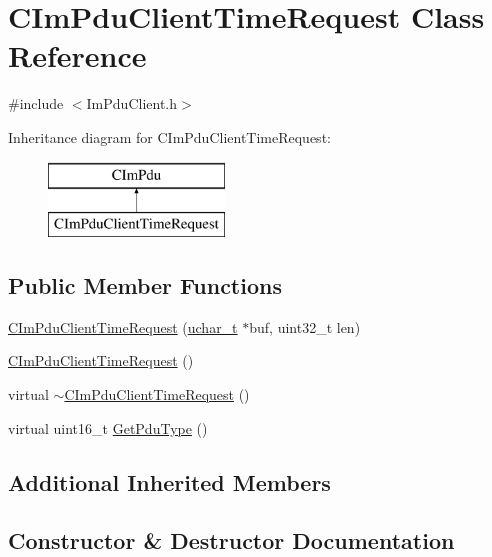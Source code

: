 \hypertarget{class_c_im_pdu_client_time_request}{}\section{C\+Im\+Pdu\+Client\+Time\+Request Class Reference}
\label{class_c_im_pdu_client_time_request}


{\ttfamily \#include $<$Im\+Pdu\+Client.\+h$>$}

Inheritance diagram for C\+Im\+Pdu\+Client\+Time\+Request\+:\begin{figure}[H]
\begin{center}
\leavevmode
\includegraphics[height=2.000000cm]{class_c_im_pdu_client_time_request}
\end{center}
\end{figure}
\subsection*{Public Member Functions}
\begin{DoxyCompactItemize}
\item 
\hyperlink{class_c_im_pdu_client_time_request_a468f176b7281d43851117943c09e576a}{C\+Im\+Pdu\+Client\+Time\+Request} (\hyperlink{base_2ostype_8h_a124ea0f8f4a23a0a286b5582137f0b8d}{uchar\+\_\+t} $\ast$buf, uint32\+\_\+t len)
\item 
\hyperlink{class_c_im_pdu_client_time_request_a62b2c5513bbe48d2ee1c8b6b48929cfe}{C\+Im\+Pdu\+Client\+Time\+Request} ()
\item 
virtual \hyperlink{class_c_im_pdu_client_time_request_a9ed2d54e97303197da00a1145194d5ff}{$\sim$\+C\+Im\+Pdu\+Client\+Time\+Request} ()
\item 
virtual uint16\+\_\+t \hyperlink{class_c_im_pdu_client_time_request_a9c44df8d2a626cd8cd1607d639b1fc64}{Get\+Pdu\+Type} ()
\end{DoxyCompactItemize}
\subsection*{Additional Inherited Members}


\subsection{Constructor \& Destructor Documentation}
\hypertarget{class_c_im_pdu_client_time_request_a468f176b7281d43851117943c09e576a}{}
